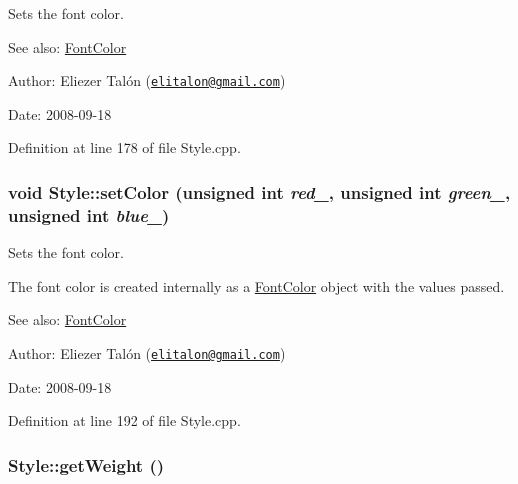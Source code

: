Sets the font color. 

\begin{Desc}
\item[See also:]\hyperlink{struct_font_color}{FontColor}\end{Desc}
\begin{Desc}
\item[Author:]Eliezer Talón (\href{mailto:elitalon@gmail.com}{\tt elitalon@gmail.com}) \end{Desc}
\begin{Desc}
\item[Date:]2008-09-18 \end{Desc}


Definition at line 178 of file Style.cpp.\hypertarget{class_style_4f2df0b03c03b39036732a51716305a0}{
\subsubsection[setColor]{\setlength{\rightskip}{0pt plus 5cm}void Style::setColor (unsigned int {\em red\_\-}, \/  unsigned int {\em green\_\-}, \/  unsigned int {\em blue\_\-})}}
\label{class_style_4f2df0b03c03b39036732a51716305a0}


Sets the font color. 

The font color is created internally as a \hyperlink{struct_font_color}{FontColor} object with the values passed.

\begin{Desc}
\item[See also:]\hyperlink{struct_font_color}{FontColor}\end{Desc}
\begin{Desc}
\item[Author:]Eliezer Talón (\href{mailto:elitalon@gmail.com}{\tt elitalon@gmail.com}) \end{Desc}
\begin{Desc}
\item[Date:]2008-09-18 \end{Desc}


Definition at line 192 of file Style.cpp.\hypertarget{class_style_39e6b6db6483c8f8baee630230fa8386}{
\subsubsection[getWeight]{ Style::getWeight ()}}
\label{class_style_39e6b6db6483c8f8baee630230fa8386}


